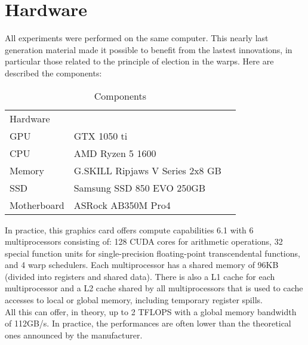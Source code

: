 
\section{Hardware}

All experiments were performed on the same computer. This nearly last generation material made it possible to benefit from the lastest innovations, in particular those related to the principle of election in the warps. Here are described the components:

\begin{table}[!ht]
\centering
\caption{Components}
\begin{tabular}{lll}
Hardware    &                                 &  \\
GPU         & GTX 1050 ti                     &  \\
CPU         & AMD Ryzen 5 1600                &  \\
Memory      & G.SKILL Ripjaws V Series 2x8 GB &  \\
SSD         & Samsung SSD 850 EVO 250GB       &  \\
Motherboard & ASRock AB350M Pro4              & 
\end{tabular}
\end{table}

In practice, this graphics card offers compute capabilities 6.1 with 6 multiprocessors consisting of:
128 CUDA cores for arithmetic operations, 32 special function units for single-precision floating-point transcendental functions, and 4 warp schedulers. Each multiprocessor has a shared memory of 96KB (divided into registers and shared data).
There is also a L1 cache for each multiprocessor and a L2 cache shared by all multiprocessors that is used to cache accesses to local or global memory, including temporary register spills.\\
All this can offer, in theory, up to 2 TFLOPS with a global memory bandwidth of 112GB/s. In practice, the performances are often lower than the theoretical ones announced by the manufacturer.